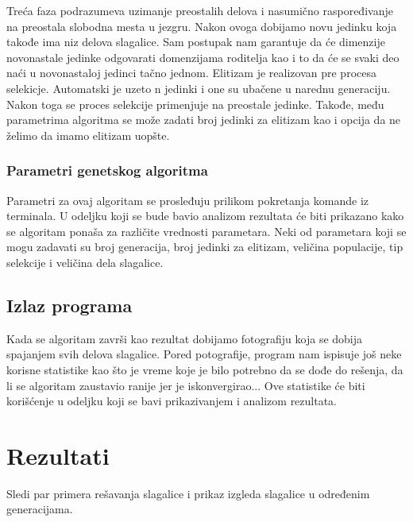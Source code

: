 \documentclass{article}
\begin{document}
Treća faza podrazumeva uzimanje preostalih delova i nasumično raspoređivanje na preostala slobodna mesta u jezgru.\newline\newline
Nakon ovoga dobijamo novu jedinku koja takođe ima niz delova slagalice. Sam postupak nam garantuje da će dimenzije novonastale jedinke odgovarati domenzijama roditelja kao i to da će se svaki deo naći u novonastaloj jedinci tačno jednom.\newline
\newline
Elitizam je realizovan pre procesa selekicje. Automatski je uzeto n jedinki i one su ubačene u narednu generaciju. Nakon toga se proces selekcije primenjuje na preostale jedinke. Takođe, među parametrima algoritma se može zadati broj jedinki za elitizam kao i opcija da ne želimo da imamo elitizam uopšte.

\subsubsection{Parametri genetskog algoritma}
Parametri za ovaj algoritam se prosleđuju prilikom pokretanja komande iz terminala. U odeljku koji se bude bavio analizom rezultata će biti prikazano kako se algoritam ponaša za različite vrednosti parametara. Neki od parametara koji se mogu zadavati su broj generacija, broj jedinki za elitizam, veličina populacije, tip selekcije i veličina dela slagalice.

\subsection{Izlaz programa}
Kada se algoritam završi kao rezultat dobijamo fotografiju koja se dobija spajanjem svih delova slagalice. Pored potografije, program nam ispisuje još neke korisne statistike kao što je vreme koje je bilo potrebno da se dođe do rešenja, da li se algoritam zaustavio ranije jer je iskonvergirao... Ove statistike će biti korišćenje u odeljku koji se bavi prikazivanjem i analizom rezultata.

\section{Rezultati}

Sledi par primera rešavanja slagalice i prikaz izgleda slagalice u određenim generacijama.
\end{document}

